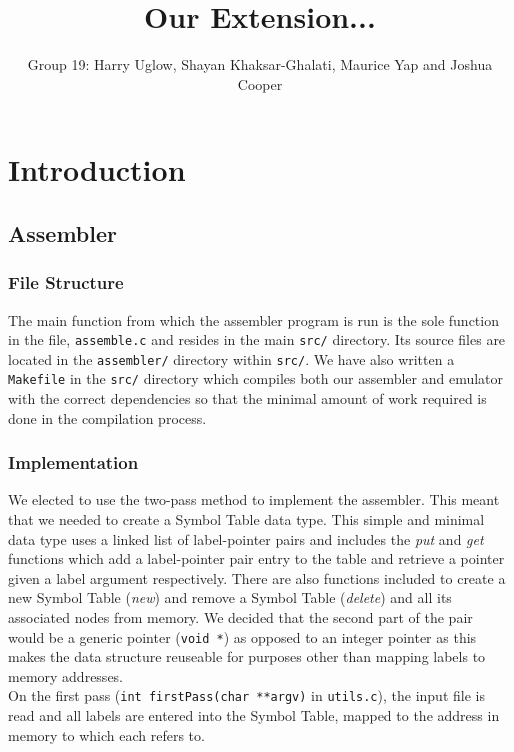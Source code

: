 \documentclass[11pt]{article}
\begin{document}
\title{Our Extension...}
\author{Group 19: Harry Uglow, Shayan Khaksar-Ghalati, Maurice Yap and Joshua Cooper}

\maketitle

\section{Introduction}

\subsection{Assembler}
\subsubsection{File Structure}
The main function from which the assembler program is run is the sole function in the file, \texttt{assemble.c} and resides in the main \texttt{src/} directory. Its source files are located in the \texttt{assembler/} directory within \texttt{src/}. We have also written a \texttt{Makefile} in the \texttt{src/} directory which compiles both our assembler and emulator with the correct dependencies so that the minimal amount of work required is done in the compilation process.
\subsubsection{Implementation}
We elected to use the two-pass method to implement the assembler. This meant that we needed to create a Symbol Table data type. This simple and minimal data type uses a linked list of label-pointer pairs and includes the \textit{put} and \textit{get} functions which add a label-pointer pair entry to the table and retrieve a pointer given a label argument respectively. There are also functions included to create a new Symbol Table (\textit{new}) and remove a Symbol Table (\textit{delete}) and all its associated nodes from memory. We decided that the second part of the pair would be a generic pointer (\texttt{void *}) as opposed to an integer pointer as this makes the data structure reuseable for purposes other than mapping labels to memory addresses.\\

On the first pass (\texttt{int firstPass(char **argv)} in \texttt{utils.c}), the input file is read and all labels are entered into the Symbol Table, mapped to the address in memory to which each refers to.
\end{document}
